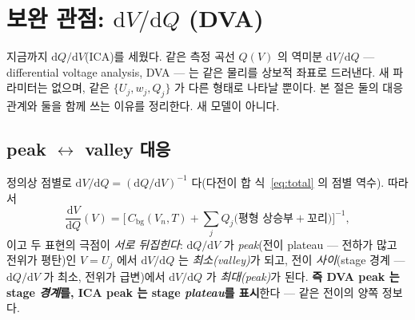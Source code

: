 \documentclass[11pt,a4paper]{article}
\newcommand{\dd}{\mathrm{d}}
\newcommand{\bg}{\mathrm{bg}}
\begin{document}
\section{보완 관점: $\dd V/\dd Q$ (DVA)}\label{sec:dva}
지금까지 $\dd Q/\dd V$(ICA)를 세웠다. 같은 측정 곡선 $Q(V)$ 의 역미분 $\dd V/\dd Q$ — differential voltage
analysis, DVA — 는 같은 물리를 상보적 좌표로 드러낸다. 새 파라미터는 없으며, 같은 $\{U_j,w_j,Q_j\}$ 가 다른
형태로 나타날 뿐이다. 본 절은 둘의 대응 관계와 둘을 함께 쓰는 이유를 정리한다. 새 모델이 아니다.

\subsection{peak $\leftrightarrow$ valley 대응}
정의상 점별로 $\dd V/\dd Q=(\dd Q/\dd V)^{-1}$ 다(다전이 합 식~\eqref{eq:total} 의 점별 역수). 따라서
\begin{equation}
\frac{\dd V}{\dd Q}(V)=\Big[\,C_\bg(V_n,T)+\sum_{j}Q_j\big(\text{평형 상승부}+\text{꼬리}\big)\Big]^{-1},
\label{eq:dva}
\end{equation}
이고 두 표현의 극점이 \emph{서로 뒤집힌다}: $\dd Q/\dd V$ 가 \emph{peak}(전이 plateau — 전하가 많고 전위가 평탄)인
$V=U_j$ 에서 $\dd V/\dd Q$ 는 \emph{최소(valley)}가 되고, 전이 \emph{사이}(stage 경계 — $\dd Q/\dd V$ 가 최소,
전위가 급변)에서 $\dd V/\dd Q$ 가 \emph{최대(peak)}가 된다. \textbf{즉 DVA peak 는 stage \emph{경계}를, ICA peak 는
stage \emph{plateau}를 표시}한다 — 같은 전이의 양쪽 정보다.
\end{document}
